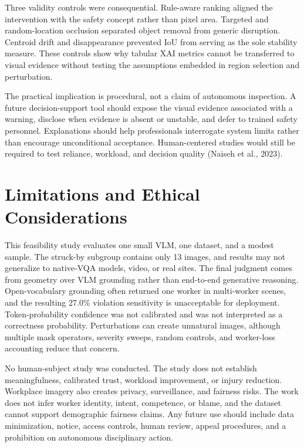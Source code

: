 \documentclass[12pt,letterpaper,twoside]{article}
\begin{document}
Three validity controls were consequential. Rule-aware ranking aligned the intervention with the safety concept rather than pixel area. Targeted and random-location occlusion separated object removal from generic disruption. Centroid drift and disappearance prevented IoU from serving as the sole stability measure. These controls show why tabular XAI metrics cannot be transferred to visual evidence without testing the assumptions embedded in region selection and perturbation.

The practical implication is procedural, not a claim of autonomous inspection. A future decision-support tool should expose the visual evidence associated with a warning, disclose when evidence is absent or unstable, and defer to trained safety personnel. Explanations should help professionals interrogate system limits rather than encourage unconditional acceptance. Human-centered studies would still be required to test reliance, workload, and decision quality (Naiseh et al., 2023).

\section{Limitations and Ethical Considerations}

This feasibility study evaluates one small VLM, one dataset, and a modest sample. The struck-by subgroup contains only 13 images, and results may not generalize to native-VQA models, video, or real sites. The final judgment comes from geometry over VLM grounding rather than end-to-end generative reasoning. Open-vocabulary grounding often returned one worker in multi-worker scenes, and the resulting 27.0\% violation sensitivity is unacceptable for deployment. Token-probability confidence was not calibrated and was not interpreted as a correctness probability. Perturbations can create unnatural images, although multiple mask operators, severity sweeps, random controls, and worker-loss accounting reduce that concern.

No human-subject study was conducted. The study does not establish meaningfulness, calibrated trust, workload improvement, or injury reduction. Workplace imagery also creates privacy, surveillance, and fairness risks. The work does not infer worker identity, intent, competence, or blame, and the dataset cannot support demographic fairness claims. Any future use should include data minimization, notice, access controls, human review, appeal procedures, and a prohibition on autonomous disciplinary action.
\end{document}
